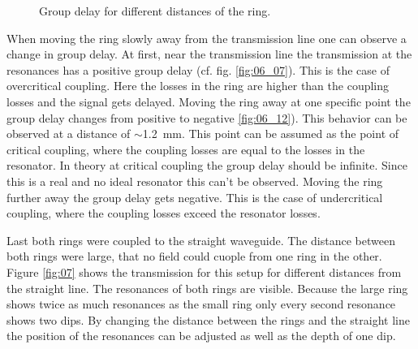 \begin{figure}[t]
\caption{Group delay for different distances of the ring.}%
\label{fig:06}%
\end{figure}
When moving the ring slowly away from the transmission line one can observe a change in group delay. At first, near the transmission line the transmission at the resonances has a positive group delay (cf. fig. \ref{fig:06_07}). This is the case of overcritical coupling. Here the losses in the ring are higher than the coupling losses and the signal gets delayed. Moving the ring away at one specific point the group delay changes from positive to negative \ref{fig:06_12}). This behavior can be observed at a distance of $\sim$1.2~mm. This point can be assumed as the point of critical coupling, where the coupling losses are equal to the losses in the resonator. In theory at critical coupling the group delay should be infinite. Since this is a real and no ideal resonator this can't be observed.
Moving the ring further away the group delay gets negative. This is the case of undercritical coupling, where the coupling losses exceed the resonator losses. 

Last both rings were coupled to the straight waveguide. The distance between both rings were large, that no field could cuople from one ring in the other. Figure \ref{fig:07} shows the transmission for this setup for different distances from the straight line. The resonances of both rings are visible. Because the large ring shows twice as much resonances as the small ring only every second resonance shows two dips. By changing the distance between the rings and the straight line the position of the resonances can be adjusted as well as the depth of one dip.

